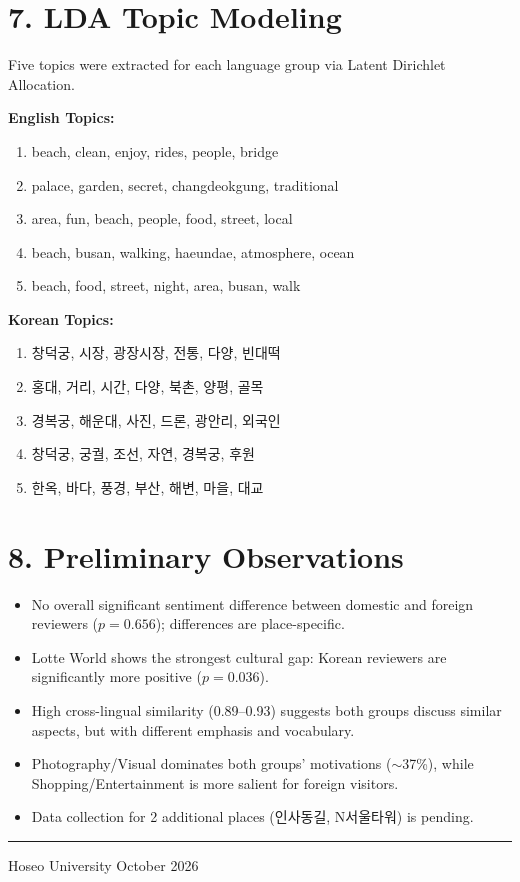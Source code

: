 \documentclass[11pt,a4paper]{article}
\begin{document}
\section*{7. LDA Topic Modeling}

Five topics were extracted for each language group via Latent Dirichlet
Allocation.

\textbf{English Topics:}
\begin{enumerate}\itemsep2pt
  \item beach, clean, enjoy, rides, people, bridge
  \item palace, garden, secret, changdeokgung, traditional
  \item area, fun, beach, people, food, street, local
  \item beach, busan, walking, haeundae, atmosphere, ocean
  \item beach, food, street, night, area, busan, walk
\end{enumerate}

\textbf{Korean Topics:}
\begin{enumerate}\itemsep2pt
  \item 창덕궁, 시장, 광장시장, 전통, 다양, 빈대떡
  \item 홍대, 거리, 시간, 다양, 북촌, 양평, 골목
  \item 경복궁, 해운대, 사진, 드론, 광안리, 외국인
  \item 창덕궁, 궁궐, 조선, 자연, 경복궁, 후원
  \item 한옥, 바다, 풍경, 부산, 해변, 마을, 대교
\end{enumerate}

\section*{8. Preliminary Observations}

\begin{itemize}\itemsep3pt
  \item No overall significant sentiment difference between domestic and
        foreign reviewers ($p = 0.656$); differences are place-specific.
  \item Lotte World shows the strongest cultural gap: Korean reviewers
        are significantly more positive ($p = 0.036$).
  \item High cross-lingual similarity (0.89--0.93) suggests both groups
        discuss similar aspects, but with different emphasis and vocabulary.
  \item Photography/Visual dominates both groups' motivations ($\sim$37\%),
        while Shopping/Entertainment is more salient for foreign visitors.
  \item Data collection for 2 additional places (인사동길, N서울타워) is pending.
\end{itemize}

\vspace{8pt}
\noindent\rule{\linewidth}{0.4pt}
{\small Hoseo University \hfill October 2026}
\end{document}
